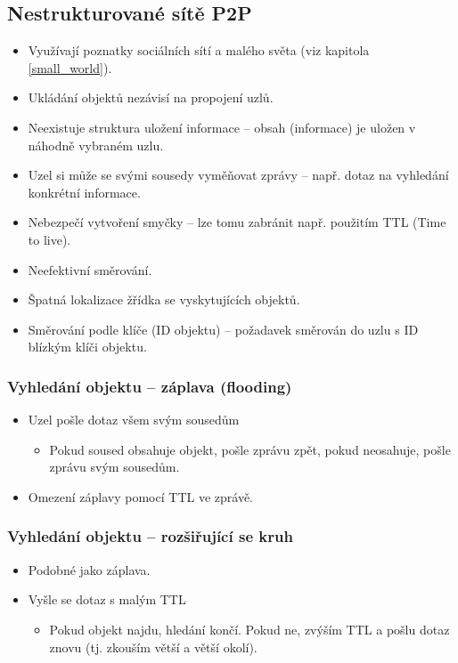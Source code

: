 \documentclass[11pt,a4paper]{article}
\begin{document}
\subsection{Nestrukturované sítě P2P}
\begin{itemize}
\item Využívají poznatky sociálních sítí a malého světa (viz kapitola \ref{small_world}).
\item Ukládání objektů nezávisí na propojení uzlů.
\item Neexistuje struktura uložení informace -- obsah (informace) je uložen v náhodně vybraném uzlu.
\item Uzel si může se svými sousedy vyměňovat zprávy -- např. dotaz na vyhledání konkrétní informace.
\item Nebezpečí vytvoření smyčky --  lze tomu zabránit např. použitím TTL (Time to live).
\item Neefektivní směrování.
\item Špatná lokalizace žřídka se vyskytujících objektů.
\item Směrování podle klíče (ID objektu) -- požadavek směrován do uzlu s ID blízkým klíči objektu.
\end{itemize}

\subsubsection{Vyhledání objektu -- záplava (flooding)}
\begin{itemize}
\item Uzel pošle dotaz všem svým sousedům
\begin{itemize}
\item Pokud soused obsahuje objekt, pošle zprávu zpět, pokud neosahuje, pošle zprávu svým sousedům.
\end{itemize}
\item Omezení záplavy pomocí TTL ve zprávě.
\end{itemize}

\subsubsection{Vyhledání objektu -- rozšiřující se kruh}
\begin{itemize}
\item Podobné jako záplava.
\item Vyšle se dotaz s malým TTL
	\begin{itemize}
	\item Pokud objekt najdu, hledání končí. Pokud ne, zvýším TTL a pošlu dotaz znovu (tj. zkouším větší a větší okolí).
	\end{itemize}
\end{itemize}
\end{document}
